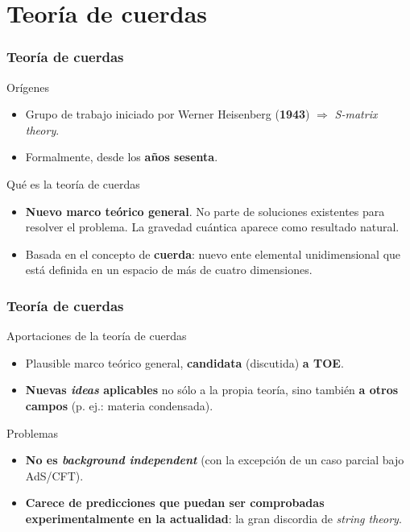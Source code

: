\documentclass{beamer}
\begin{document}
\section{Teoría de cuerdas}
\begin{frame}
  \frametitle{Teoría de cuerdas}
  \begin{block}{Orígenes}
    \begin{itemize}
      \item Grupo de trabajo iniciado por Werner Heisenberg (\textbf{1943}) $\Rightarrow$ \textit{S-matrix theory}.
      \item Formalmente, desde los \textbf{años sesenta}.
    \end{itemize}
  \end{block}
  \begin{block}{Qué es la teoría de cuerdas}
    \begin{itemize}
      \item \textbf{Nuevo marco teórico general}. No parte de soluciones existentes para resolver el problema. La gravedad cuántica aparece como resultado natural.
      \item Basada en el concepto de \textbf{cuerda}: nuevo ente elemental unidimensional que está definida en un espacio de más de cuatro dimensiones.
    \end{itemize}
  \end{block}
\end{frame}
%
%
\begin{frame}
  \frametitle{Teoría de cuerdas}
  \begin{exampleblock}{Aportaciones de la teoría de cuerdas}
    \begin{itemize}
      \item Plausible marco teórico general, \textbf{candidata} (discutida) \textbf{a TOE}.
      \item \textbf{Nuevas \textit{ideas} aplicables} no sólo a la propia teoría, sino también \textbf{a otros campos} (p. ej.: materia condensada).
    \end{itemize}
  \end{exampleblock}
  \begin{alertblock}{Problemas}
    \begin{itemize}
      \item \textbf{No es \textit{background independent}} (con la excepción de un caso parcial bajo AdS/CFT).
      \item \textbf{Carece de predicciones que puedan ser comprobadas experimentalmente en la actualidad}: la gran discordia de \textit{string theory}.
    \end{itemize}
  \end{alertblock}
\end{frame}
%
%
\end{document}

